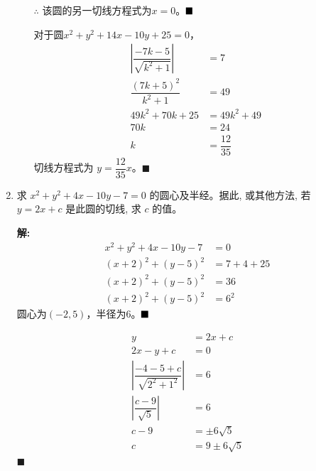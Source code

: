 \documentclass[10pt]{article}
\newcommand{\sol}{\textbf{解:} }
\begin{document}
\begin{enumerate}[leftmargin=*]
\begin{enumerate}
                $\therefore$ 该圆的另一切线方程式为$x = 0$。$\hfill\blacksquare$

                对于圆$x^{2} + y^{2} + 14x - 10y + 25 = 0$，
                \begin{align*}
                  \left\vert \dfrac{-7k - 5}{\sqrt{k^{2} + 1}} \right\vert & = 7              \\
                  \dfrac{(7k + 5)^{2}}{k^{2} + 1}                          & = 49             \\
                  49k^{2} + 70k + 25                                       & = 49k^{2} + 49   \\
                  70k                                                      & = 24             \\
                  k                                                        & = \dfrac{12}{35}
                \end{align*}
                切线方程式为 $y = \dfrac{12}{35}x$。\hfill$\blacksquare$
        \end{enumerate}

  \item 求 $x^{2}+y^{2}+4 x-10 y-7=0$ 的圆心及半经。据此, 或其他方法, 若 $y=2 x+c$ 是此圆的切线, 求 $c$ 的值。

        \sol{}
        \begin{align*}
          x^{2} + y^{2} + 4x - 10y - 7 & = 0          \\
          (x + 2)^{2} + (y - 5)^{2}    & = 7 + 4 + 25 \\
          (x + 2)^{2} + (y - 5)^{2}    & = 36         \\
          (x + 2)^{2} + (y - 5)^{2}    & = 6^{2}
        \end{align*}
        圆心为$(-2, 5)$，半径为$6$。$\hfill\blacksquare$

        \begin{align*}
          y                                                               & = 2x + c          \\
          2x - y + c                                                      & = 0               \\
          \left\vert \dfrac{-4 - 5 + c}{\sqrt{2^{2} + 1^{2}}} \right\vert & = 6               \\
          \left\vert \dfrac{c - 9}{\sqrt{5}} \right\vert                  & = 6               \\
          c - 9                                                           & = \pm 6\sqrt{5}   \\
          c                                                               & = 9 \pm 6\sqrt{5}
        \end{align*} \hfill$\blacksquare$


\end{enumerate}
\end{document}
